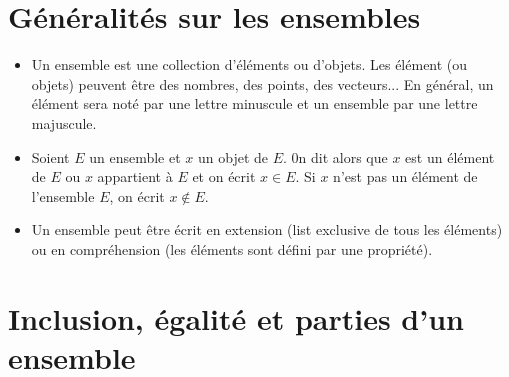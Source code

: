 \documentclass[10pt]{article}
\begin{document}
\maketitle

\section{Généralités sur les ensembles}

\begin{itemize}
    \item Un ensemble est une collection d'éléments ou d'objets. Les élément (ou objets) peuvent être des nombres, des points, des
          vecteurs... En général, un élément sera noté par une lettre minuscule et un ensemble par une lettre majuscule.
    \item Soient $E$ un ensemble et $x$ un objet de $E$. 0n dit alors que $x$ est un élément de $E$ ou
          $x$ appartient à $E$ et on écrit $x \in E$. Si $x$ n'est pas un élément de l'ensemble $E$, on écrit $x \not\in E$.
    \item Un ensemble peut être écrit en extension (list exclusive de tous les éléments) ou en compréhension
          (les éléments sont défini par une propriété).
\end{itemize}



\section{Inclusion, égalité et parties d'un ensemble}


\end{document}
